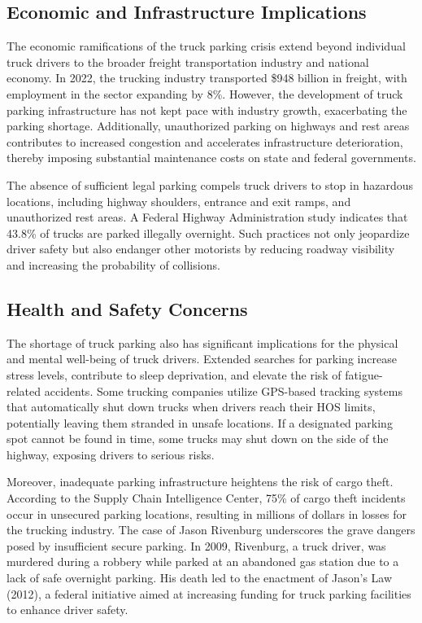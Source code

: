 \documentclass[
  12pt]{article}
\begin{document}
\subsection{Economic and Infrastructure
Implications}\label{economic-and-infrastructure-implications}

The economic ramifications of the truck parking crisis extend beyond
individual truck drivers to the broader freight transportation industry
and national economy. In 2022, the trucking industry transported \$948
billion in freight, with employment in the sector expanding by 8\%.
However, the development of truck parking infrastructure has not kept
pace with industry growth, exacerbating the parking shortage.
Additionally, unauthorized parking on highways and rest areas
contributes to increased congestion and accelerates infrastructure
deterioration, thereby imposing substantial maintenance costs on state
and federal governments.

The absence of sufficient legal parking compels truck drivers to stop in
hazardous locations, including highway shoulders, entrance and exit
ramps, and unauthorized rest areas. A Federal Highway Administration
study indicates that 43.8\% of trucks are parked illegally overnight.
Such practices not only jeopardize driver safety but also endanger other
motorists by reducing roadway visibility and increasing the probability
of collisions.

\subsection{Health and Safety
Concerns}\label{health-and-safety-concerns}

The shortage of truck parking also has significant implications for the
physical and mental well-being of truck drivers. Extended searches for
parking increase stress levels, contribute to sleep deprivation, and
elevate the risk of fatigue-related accidents. Some trucking companies
utilize GPS-based tracking systems that automatically shut down trucks
when drivers reach their HOS limits, potentially leaving them stranded
in unsafe locations. If a designated parking spot cannot be found in
time, some trucks may shut down on the side of the highway, exposing
drivers to serious risks.

Moreover, inadequate parking infrastructure heightens the risk of cargo
theft. According to the Supply Chain Intelligence Center, 75\% of cargo
theft incidents occur in unsecured parking locations, resulting in
millions of dollars in losses for the trucking industry. The case of
Jason Rivenburg underscores the grave dangers posed by insufficient
secure parking. In 2009, Rivenburg, a truck driver, was murdered during
a robbery while parked at an abandoned gas station due to a lack of safe
overnight parking. His death led to the enactment of Jason's Law (2012),
a federal initiative aimed at increasing funding for truck parking
facilities to enhance driver safety.
\end{document}
